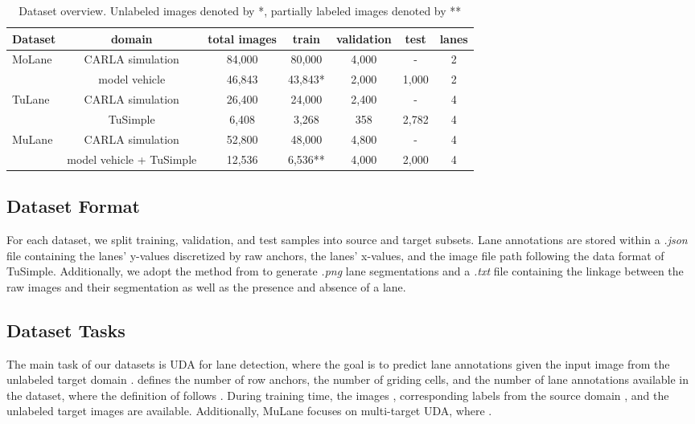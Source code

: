 \documentclass{article}
\begin{document}
	\begin{table}
		\caption{Dataset overview. Unlabeled images denoted by *, partially labeled images denoted by ** }
		\label{table:Dataset overview}
		\small
		\centering
		\begin{tabular}{lcccccc}
			\toprule
			Dataset                  & domain             & total images & train   & validation  & test  & lanes       \\ \midrule
			\multirow{2}{*}{MoLane}  & CARLA simulation   & 84,000       & 80,000  & 4,000       & -     &  2  \\ 
			& model vehicle      & 46,843       & 43,843* & 2,000       & 1,000 &  2  \\ \midrule
			\multirow{2}{*}{TuLane}  & CARLA simulation   & 26,400       & 24,000  & 2,400       & -     &  4  \\ 
			& TuSimple \cite{TuSimple2017} & 6,408        & 3,268   & 358         & 2,782 &  4  \\ \midrule
			\multirow{2}{*}{MuLane}  & CARLA simulation   & 52,800       & 48,000  & 4,800       & -     &  4  \\ 
			& model vehicle + TuSimple \cite{TuSimple2017} & 12,536      & 6,536** & 4,000       & 2,000 &  4  \\ 
			\bottomrule
		\end{tabular}
	\end{table}
	
	\subsection{Dataset Format}
	For each dataset, we split training, validation, and test samples into source and target subsets. Lane annotations are stored within a \emph{.json} file containing the lanes' y-values discretized by raw anchors, the lanes' x-values, and the image file path following the data format of TuSimple\cite{TuSimple2017}. Additionally, we adopt the method from \cite{qin2020ultra} to generate \emph{.png} lane segmentations and a \emph{.txt} file containing the linkage between the raw images and their segmentation as well as the presence and absence of a lane.  
	
	
	\subsection{Dataset Tasks}
	The main task of our datasets is UDA for lane detection, where the goal is to predict lane annotations  given the input image  from the unlabeled target domain .  defines the number of row anchors,  the number of griding cells, and  the number of lane annotations available in the dataset, where the definition of  follows \cite{TuSimple2017}. During training time, the images , corresponding labels  from the source domain , and the unlabeled target images  are available. Additionally, MuLane focuses on multi-target UDA, where .
	
\end{document}
